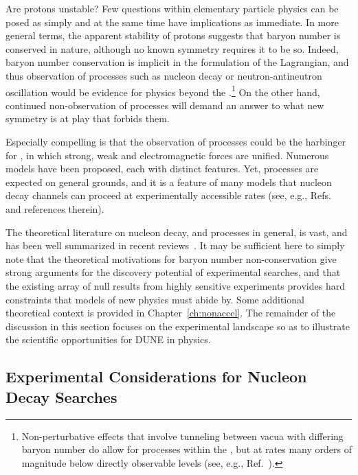 Are protons unstable?  Few questions within elementary 
particle physics can be posed as simply and at the same time 
have implications as immediate.  In more general terms, the 
apparent stability of protons suggests that baryon number 
is conserved in nature, although no known symmetry 
requires it to be so.  Indeed, baryon number conservation is 
implicit in the formulation of the  Lagrangian, and 
thus observation of  processes such 
as nucleon decay or neutron-antineutron oscillation 
would be evidence for physics beyond the .\footnote{Non-perturbative 
effects that involve tunneling between vacua with differing baryon number 
do allow for  processes within the , but at rates many orders of 
magnitude below directly observable levels (see, e.g., Ref.~\cite{Nath:2006ut}).}
On the other hand, continued non-observation of  processes will 
demand an answer to what new symmetry is at play that forbids 
them.
 
Especially compelling is that the observation of  processes 
could be the harbinger for , in which strong, weak and 
electromagnetic forces are unified.  Numerous  models 
have been proposed, each with distinct features.  Yet,  processes 
are expected on general grounds, and it is a feature of many models 
that nucleon decay channels can proceed at experimentally 
accessible rates (see, e.g., Refs.~\cite{Nath:2006ut,Babu:2013jba} 
and references therein).

The theoretical literature on nucleon decay, and  processes in general,  
is vast, and has been well summarized in recent 
reviews~\cite{Nath:2006ut,Babu:2013jba}.  
It may be sufficient here to simply note that the 
theoretical motivations for baryon number non-conservation give strong 
arguments for the discovery potential of experimental searches, 
and that the existing array of null results from highly sensitive experiments  
provides hard constraints that models of new physics must abide by.
Some additional theoretical context is provided in Chapter~\ref{ch:nonaccel}.
The remainder of the discussion in this section focuses on the experimental 
landscape so as to illustrate the scientific opportunities for DUNE in  physics.

\subsection{Experimental Considerations for Nucleon Decay Searches}
\label{subsec:landscape-ndk-expt}

